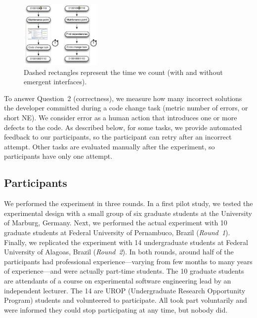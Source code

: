 

\begin{figure}[tp]
    \centering \includegraphics[width=0.35\textwidth]{images/Workflow-Time.pdf}
    \caption{Dashed rectangles represent the time we count (with and without emergent interfaces).}
    \label{fig:workflow-time}
\end{figure}

To answer Question~2 (correctness), we measure how many incorrect solutions the developer committed during a code change task (metric number of errors, or short NE). We consider error as a human action that introduces one or more defects to the code. 
As described below, for some tasks, we provide automated feedback to our participants, so the participant can retry after an incorrect attempt. Other tasks are evaluated manually after the experiment, so participants have only one attempt.

\subsection{Participants}

We performed the experiment in three rounds. In a first pilot study, we tested the experimental design with a small group of six graduate students at the University of Marburg, Germany. Next, we performed the actual experiment with 10 graduate students at Federal University of Pernambuco, Brazil (\textit{Round~1}). Finally, we replicated the experiment with 14 undergraduate students at Federal University of Alagoas, Brazil (\textit{Round~2}). In both rounds, around half of the participants had professional experience---varying from few months to many years of experience---and were actually part-time students. The 10 graduate students are attendants of a course on experimental software engineering lead by an independent lecturer. The 14 are UROP (Undergraduate Research Opportunity Program) students and volunteered to participate. All took part voluntarily and were informed they could stop participating at any time, but nobody did.


